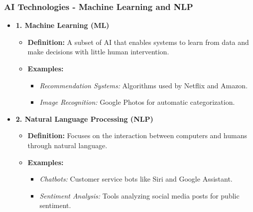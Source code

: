 \documentclass{beamer}
\begin{document}
\begin{frame}[fragile]
    \frametitle{AI Technologies - Machine Learning and NLP}
    \begin{itemize}
        \item \textbf{1. Machine Learning (ML)}
        \begin{itemize}
            \item \textbf{Definition:} A subset of AI that enables systems to learn from data and make decisions with little human intervention.
            \item \textbf{Examples:}
            \begin{itemize}
                \item \textit{Recommendation Systems:} Algorithms used by Netflix and Amazon.
                \item \textit{Image Recognition:} Google Photos for automatic categorization.
            \end{itemize}
        \end{itemize}
        
        \item \textbf{2. Natural Language Processing (NLP)}
        \begin{itemize}
            \item \textbf{Definition:} Focuses on the interaction between computers and humans through natural language.
            \item \textbf{Examples:}
            \begin{itemize}
                \item \textit{Chatbots:} Customer service bots like Siri and Google Assistant.
                \item \textit{Sentiment Analysis:} Tools analyzing social media posts for public sentiment.
            \end{itemize}
        \end{itemize}
    \end{itemize}
\end{frame}
\end{document}
